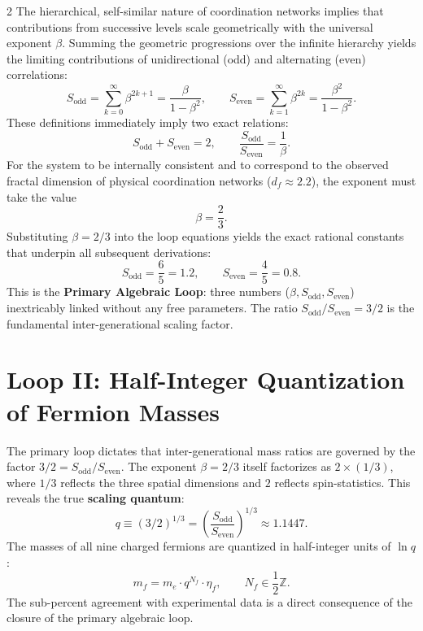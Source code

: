 \documentclass[12pt,a4paper]{article}
\begin{document}
\begin{multicols}{2}
		The hierarchical, self-similar nature of coordination networks implies that contributions from successive levels scale geometrically with the universal exponent \(\beta\). Summing the geometric progressions over the infinite hierarchy yields the limiting contributions of unidirectional (odd) and alternating (even) correlations:
		\begin{equation}
			S_{\mathrm{odd}} = \sum_{k=0}^{\infty} \beta^{2k+1} = \frac{\beta}{1-\beta^{2}}, \qquad
			S_{\mathrm{even}} = \sum_{k=1}^{\infty} \beta^{2k} = \frac{\beta^{2}}{1-\beta^{2}}.
		\end{equation}
		These definitions immediately imply two exact relations:
		\begin{equation}
			S_{\mathrm{odd}} + S_{\mathrm{even}} = 2, \qquad \frac{S_{\mathrm{odd}}}{S_{\mathrm{even}}} = \frac{1}{\beta}.
		\end{equation}
		For the system to be internally consistent and to correspond to the observed fractal dimension of physical coordination networks (\(d_f \approx 2.2\)), the exponent must take the value
		\begin{equation}
			\boxed{\beta = \frac{2}{3}}.
		\end{equation}
		Substituting \(\beta = 2/3\) into the loop equations yields the exact rational constants that underpin all subsequent derivations:
		\begin{equation}
			\boxed{S_{\mathrm{odd}} = \frac{6}{5} = 1.2, \qquad S_{\mathrm{even}} = \frac{4}{5} = 0.8.}
		\end{equation}
		This is the \textbf{Primary Algebraic Loop}: three numbers (\(\beta, S_{\mathrm{odd}}, S_{\mathrm{even}}\)) inextricably linked without any free parameters. The ratio \(S_{\mathrm{odd}}/S_{\mathrm{even}} = 3/2\) is the fundamental inter-generational scaling factor.
		
		\section{Loop II: Half-Integer Quantization of Fermion Masses}
		
		The primary loop dictates that inter-generational mass ratios are governed by the factor \(3/2 = S_{\mathrm{odd}}/S_{\mathrm{even}}\). The exponent \(\beta = 2/3\) itself factorizes as \(2 \times (1/3)\), where \(1/3\) reflects the three spatial dimensions and \(2\) reflects spin-statistics. This reveals the true \textbf{scaling quantum}:
		\begin{equation}
			q \equiv (3/2)^{1/3} = \left( \frac{S_{\mathrm{odd}}}{S_{\mathrm{even}}} \right)^{1/3} \approx 1.1447.
		\end{equation}
		The masses of all nine charged fermions are quantized in half-integer units of \(\ln q\):
		\begin{equation}
			m_f = m_e \cdot q^{N_f} \cdot \eta_f, \qquad N_f \in \frac{1}{2}\mathbb{Z}.
		\end{equation}
		The sub-percent agreement with experimental data is a direct consequence of the closure of the primary algebraic loop.
		

\end{multicols}
\end{document}
